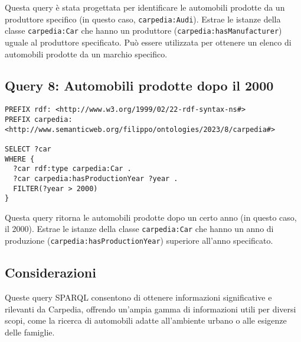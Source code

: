 Questa query è stata progettata per identificare le automobili prodotte da un produttore specifico
(in questo caso, \texttt{carpedia:Audi}). Estrae le istanze della classe \texttt{carpedia:Car} che hanno un produttore
(\texttt{carpedia:hasManufacturer}) uguale al produttore specificato. Può essere utilizzata per ottenere un elenco
di automobili prodotte da un marchio specifico.

\break

\subsection{Query 8: Automobili prodotte dopo il 2000}

\begin{lstlisting}[language=SPARQL]
PREFIX rdf: <http://www.w3.org/1999/02/22-rdf-syntax-ns#>
PREFIX carpedia: <http://www.semanticweb.org/filippo/ontologies/2023/8/carpedia#>

SELECT ?car
WHERE {
  ?car rdf:type carpedia:Car .
  ?car carpedia:hasProductionYear ?year .
  FILTER(?year > 2000)
}
\end{lstlisting}


Questa query ritorna le automobili prodotte dopo un certo anno (in questo caso, il 2000). Estrae le istanze della classe \texttt{carpedia:Car} che hanno un anno di produzione (\texttt{carpedia:hasProductionYear}) superiore all'anno specificato.

\subsection{Considerazioni}
Queste query SPARQL consentono di ottenere informazioni significative e rilevanti da Carpedia, offrendo un'ampia gamma di informazioni utili per diversi scopi, come la ricerca di automobili adatte all'ambiente urbano o alle esigenze delle famiglie.
